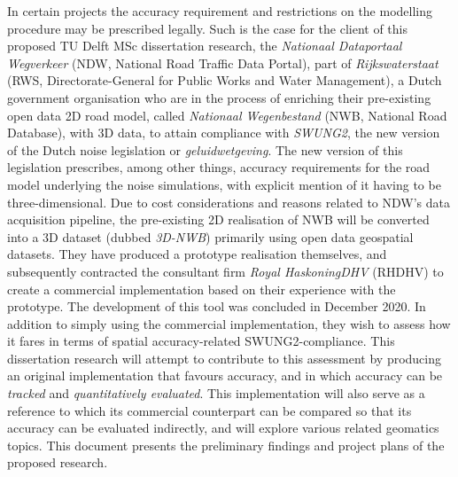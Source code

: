 In certain projects the accuracy requirement and restrictions on the modelling procedure may be prescribed legally. Such is the case for the client of this proposed TU Delft MSc dissertation research, the \textit{Nationaal Dataportaal Wegverkeer} (NDW, National Road Traffic Data Portal), part of \textit{Rijkswaterstaat} (RWS, Directorate-General for Public Works and Water Management), a Dutch government organisation who are in the process of enriching their pre-existing open data 2D road model, called \textit{Nationaal Wegenbestand} (NWB, National Road Database), with 3D data, to attain compliance with \textit{SWUNG2}, the new version of the Dutch noise legislation or \textit{geluidwetgeving}. The new version of this legislation prescribes, among other things, accuracy requirements for the road model underlying the noise simulations, with explicit mention of it having to be three-dimensional. Due to cost considerations and reasons related to NDW’s data acquisition pipeline, the pre-existing 2D realisation of NWB will be converted into a 3D dataset (dubbed \textit{3D-NWB}) primarily using open data geospatial datasets. They have produced a prototype realisation themselves, and subsequently contracted the consultant firm \textit{Royal HaskoningDHV} (RHDHV) to create a commercial implementation based on their experience with the prototype. The development of this tool was concluded in December 2020. In addition to simply using the commercial implementation, they wish to assess how it fares in terms of spatial accuracy-related SWUNG2-compliance. This dissertation research will attempt to contribute to this assessment by producing an original implementation that favours accuracy, and in which accuracy can be \textit{tracked} and \textit{quantitatively evaluated}. This implementation will also serve as a reference to which its commercial counterpart can be compared so that its accuracy can be evaluated indirectly, and will explore various related geomatics topics. This document presents the preliminary findings and project plans of the proposed research.

